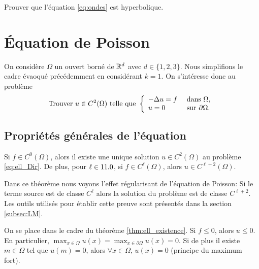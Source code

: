 \documentclass[12pt,a4paper,twoside]{article}
\begin{document}
\begin{exercise}
  Prouver que l'\'equation \eqref{eq:ondes} est hyperbolique.
\end{exercise}

\section{\'Equation de Poisson}

On consid\`ere $\Omega$ un ouvert born\'e de $\mathbb{R}^d$ avec $d \in \{1,2,3\}$.
Nous simplifions le cadre \'evaoqu\'e pr\'ec\'edemment
en consid\'erant $k=1$.
On s'int\'eresse donc au probl\`eme
\begin{equation}
  \label{eq:ell_Dir}
  \text{Trouver $u \in C^2(\Omega)$ telle que  }
  \left\{
    \begin{array}{l l}
      - \Delta u = f &\text{ dans } \Omega ,
      \\
      u = 0 &\text{ sur } \partial \Omega .
    \end{array}
  \right.
\end{equation}

\subsection{Propri\'et\'es g\'en\'erales de l'\'equation}

\begin{theorem}
  \label{thm:ell_existence}
  Si $f \in C^0(\Omega)$, alors il existe une unique solution
  $u \in C^2(\Omega)$ au probl\`eme \eqref{eq:ell_Dir}.
  De plus, pour $\ell \in 11.0$, si $f \in C^{\ell}(\Omega)$, alors
  $u \in C^{\ell+2}(\Omega)$.
\end{theorem}

Dans ce th\'eor\`eme nous voyons l'effet r\'egularisant de l'\'equation de Poisson:
Si le terme source est de classe $C^{\ell}$ alors la solution du probl\`eme
est de classe $C^{\ell + 2}$.
Les outils utilis\'es pour \'etablir cette preuve sont pr\'esent\'es
dans la section \ref{subsec:LM}.

\begin{proposition}
  On se place dans le cadre du th\'eor\`eme \ref{thm:ell_existence}.
  Si $f \leq 0$, alors $u \leq 0$. En particulier,
  $\max_{x\in \Omega} u(x) = \max_{x\in \partial \Omega} u(x) = 0$.
  Si de plus il existe $m\in \Omega$ tel que $u(m) = 0$,
  alors $\forall x \in \Omega$, $u(x) = 0$ 
  (principe du maximum fort).
\end{proposition}
\end{document}
